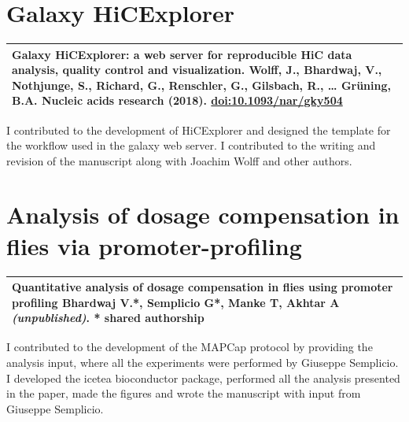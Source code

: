 \documentclass[11pt,twoside]{MPIthesis}
\theoremstyle{definition}
\theoremstyle{definition}
\theoremstyle{definition}
\theoremstyle{remark}
\begin{document}




\section{Galaxy HiCExplorer}\label{galaxy-hicexplorer}
\begin{longtable}[]{@{}l@{}}
\toprule
\begin{minipage}[t]{0.97\columnwidth}\raggedright\strut
\textbf{Galaxy HiCExplorer: a web server for reproducible HiC data
analysis, quality control and visualization.} Wolff, J.,
\textbf{Bhardwaj, V.}, Nothjunge, S., Richard, G., Renschler, G.,
Gilsbach, R., \ldots{} Grüning, B.A. \textbf{Nucleic acids research
(2018).} \url{doi:10.1093/nar/gky504}\strut
\end{minipage}\tabularnewline
\bottomrule
\end{longtable}
I contributed to the development of HiCExplorer and designed the
template for the workflow used in the galaxy web server. I contributed
to the writing and revision of the manuscript along with Joachim Wolff
and other authors.



\section{Analysis of dosage compensation in flies via
promoter-profiling}\label{analysis-of-dosage-compensation-in-flies-via-promoter-profiling}
\begin{longtable}[]{@{}l@{}}
\toprule
\begin{minipage}[t]{0.97\columnwidth}\raggedright\strut
\textbf{Quantitative analysis of dosage compensation in flies using
promoter profiling} Bhardwaj V.*, Semplicio G*, Manke T, Akhtar A
\emph{(unpublished)}. * shared authorship\strut
\end{minipage}\tabularnewline
\bottomrule
\end{longtable}
I contributed to the development of the MAPCap protocol by providing the
analysis input, where all the experiments were performed by Giuseppe
Semplicio. I developed the icetea bioconductor package, performed all
the analysis presented in the paper, made the figures and wrote the
manuscript with input from Giuseppe Semplicio.
\end{document}
